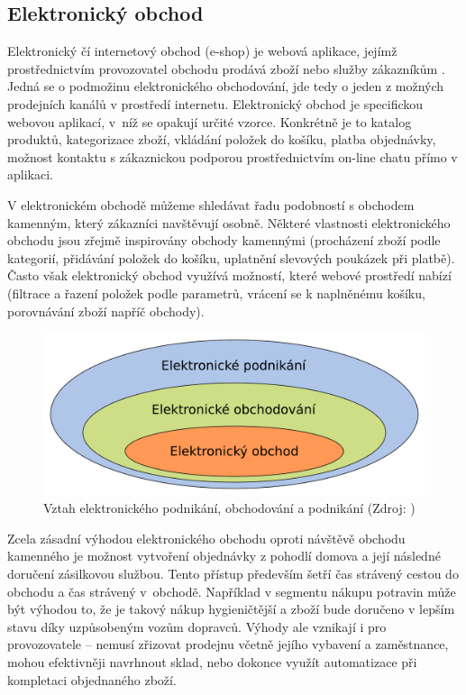 \documentclass[FM,DP]{tulthesis}
\begin{document}
\subsection*{Elektronický obchod}

Elektronický čí internetový obchod (e-shop) je webová aplikace, jejímž prostřednictvím 
provozovatel obchodu prodává zboží nebo služby zákazníkům \cite[strana~16]{e-commerce}.
Jedná se o podmožinu elektronického obchodování, jde tedy o jeden z možných prodejních 
kanálů v prostředí internetu. Elektronický obchod je specifickou webovou aplikací, v~níž 
se opakují určité vzorce. Konkrétně je to katalog produktů, kategorizace zboží, 
vkládání položek do košíku, platba objednávky, možnost kontaktu s zákaznickou podporou 
prostřednictvím on-line chatu přímo v aplikaci.

V elektronickém obchodě můžeme shledávat řadu podobností s obchodem kamenným, který zákazníci 
navštěvují osobně. Některé vlastnosti elektronického obchodu jsou zřejmě inspirovány 
obchody kamennými (procházení zboží podle kategorií, přidávání položek do košíku, 
uplatnění slevových poukázek při platbě). Často však elektronický obchod využívá možností, 
které webové prostředí nabízí (filtrace a řazení položek podle parametrů, vrácení se
k naplněnému košíku, porovnávání zboží napříč obchody).

\begin{figure}[h]
\center
\includegraphics[width=\textwidth]{e-commerce.pdf}
\caption[Vztah elektronického podnikání, obchodování a podnikání]{Vztah elektronického podnikání, obchodování a podnikání (Zdroj: \cite{strossa})}
\label{e-commerce}
\end{figure}

Zcela zásadní výhodou elektronického obchodu oproti návštěvě obchodu kamenného
je možnost vytvoření objednávky z pohodlí domova a její následné doručení zásilkovou 
službou. Tento přístup především šetří čas strávený cestou do obchodu a čas strávený 
v~obchodě. Například v segmentu nákupu potravin může být výhodou to, že je takový 
nákup hygieničtější a zboží bude doručeno v lepším stavu díky uzpůsobeným vozům dopravců.
Výhody ale vznikají i pro provozovatele -- nemusí zřizovat prodejnu včetně jejího vybavení a 
zaměstnance, mohou efektivněji navrhnout sklad, nebo dokonce využít automatizace 
při kompletaci objednaného zboží.
\end{document}
